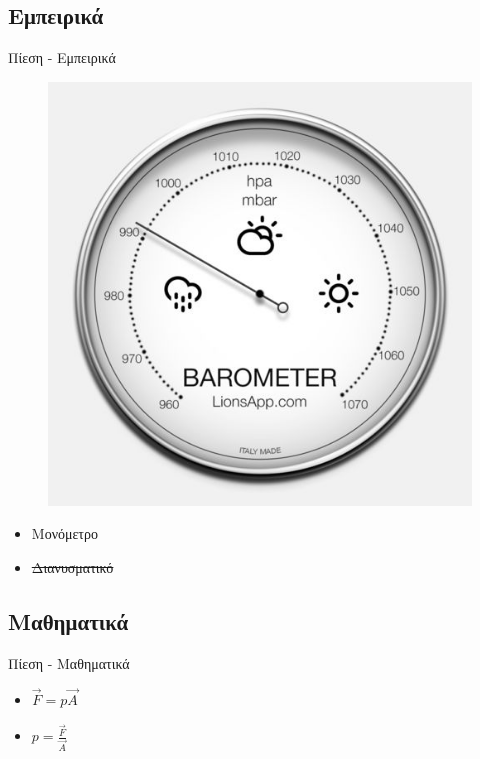 \documentclass[greek]{beamer}
\begin{document}
\subsection{Εμπειρικά}
\begin{frame}{Πίεση - Εμπειρικά}
  \begin{figure}
    \includegraphics[scale=0.2]{barometer}
  \end{figure}
  \begin{itemize}
    \item<1-> Μονόμετρο
    \item<2-> \sout{Διανυσματικό}
  \end{itemize}
\end{frame}

\subsection{Μαθηματικά}
\begin{frame}{Πίεση - Μαθηματικά}
  \begin{itemize}
    \item<1-> $\vec{F}=p\vec{A}$
    \item<2-> $\displaystyle p=\frac{\vec{F}}{\vec{A}}$
  \end{itemize}
\end{frame}
\end{document}
